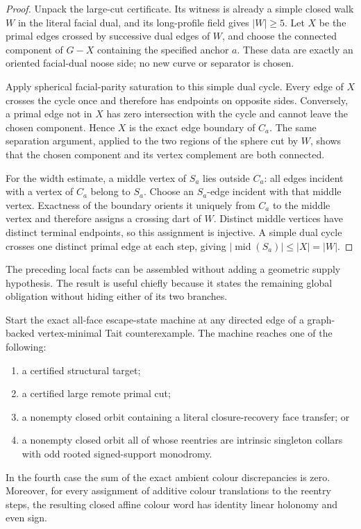 \begin{proof}
Unpack the large-cut certificate.  Its witness is already a simple closed
walk \(W\) in the literal facial dual, and its long-profile field gives
\(|W|\ge5\).  Let \(X\) be the primal edges crossed by successive dual edges
of \(W\), and choose the connected component of \(G-X\) containing the
specified anchor \(a\).  These data are exactly an oriented facial-dual
noose side; no new curve or separator is chosen.

Apply spherical facial-parity saturation to this simple dual cycle.  Every
edge of \(X\) crosses the cycle once and therefore has endpoints on opposite
sides.  Conversely, a primal edge not in \(X\) has zero intersection with
the cycle and cannot leave the chosen component.  Hence \(X\) is the exact
edge boundary of \(C_a\).  The same separation argument, applied to the two
regions of the sphere cut by \(W\), shows that the chosen component and its
vertex complement are both connected.

For the width estimate, a middle vertex of \(S_a\) lies outside \(C_a\): all
edges incident with a vertex of \(C_a\) belong to \(S_a\).  Choose an
\(S_a\)-edge incident with that middle vertex.  Exactness of the boundary
orients it uniquely from \(C_a\) to the middle vertex and therefore assigns a
crossing dart of \(W\).  Distinct middle vertices have distinct terminal
endpoints, so this assignment is injective.  A simple dual cycle crosses one
distinct primal edge at each step, giving
\(|\operatorname{mid}(S_a)|\le |X|=|W|\).
\end{proof}

The preceding local facts can be assembled without adding a geometric
supply hypothesis.  The result is useful chiefly because it states the
remaining global obligation without hiding either of its two branches.

\begin{theorem}
\label{thm:all-face-cycle-residue}
Start the exact all-face escape-state machine at any directed edge of a
graph-backed vertex-minimal Tait counterexample.  The machine reaches one of
the following:
\begin{enumerate}
\item a certified structural target;
\item a certified large remote primal cut;
\item a nonempty closed orbit containing a literal closure-recovery face
transfer; or
\item a nonempty closed orbit all of whose reentries are intrinsic singleton
collars with odd rooted signed-support monodromy.
\end{enumerate}
In the fourth case the sum of the exact ambient colour discrepancies is zero.
Moreover, for every assignment of additive colour translations to the
reentry steps, the resulting closed affine colour word has identity linear
holonomy and even sign.
\end{theorem}

